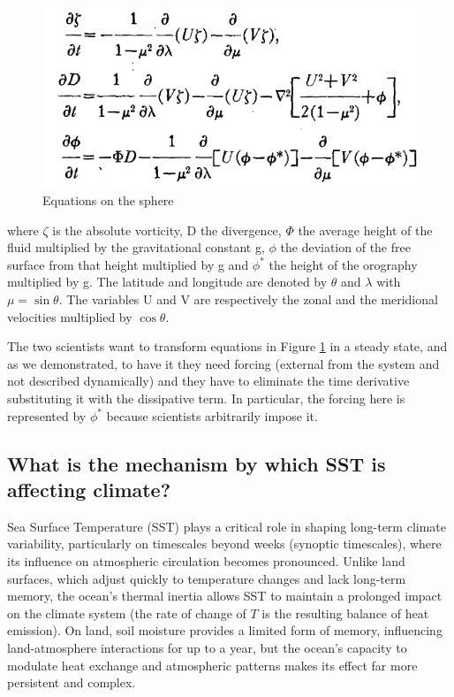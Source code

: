 \begin{figure}[htp!]
	\centering
	\includegraphics[width=0.5\linewidth]{upload/19image.png}
	\caption{Equations on the sphere}
	\label{fig: fig 2.2}

\end{figure}
where $\zeta$ is the absolute vorticity, D the divergence, $\Phi$
the average height of the fluid multiplied by the gravitational constant g, $\phi$ the deviation of the free surface from that height multiplied by g and $\phi^*$ the height of the orography multiplied by g. The latitude and longitude are denoted by $\theta$ and $\lambda$ with $\mu = \sin \theta$. The variables U and V are respectively the zonal and the meridional velocities multiplied by $\cos \theta$.


The two scientists want to transform equations in Figure \ref{fig: fig 2.2} in a steady state, and as we demonstrated, to have it they need forcing (external from the system and not described dynamically) and they have to eliminate the time derivative substituting it with the dissipative term.
In particular, the forcing here is represented by $\phi^*$ because scientists arbitrarily impose it.

\subsection{What is the mechanism by which SST is affecting climate?}

Sea Surface Temperature (SST) plays a critical role in shaping long-term climate variability, particularly on timescales beyond weeks (synoptic timescales), where its influence on atmospheric circulation becomes pronounced. Unlike land surfaces, which adjust quickly to temperature changes and lack long-term memory, the ocean's thermal inertia allows SST to maintain a prolonged impact on the climate system (the rate of change of $T$ is the resulting balance of heat emission). On land, soil moisture provides a limited form of memory, influencing land-atmosphere interactions for up to a year, but the ocean’s capacity to modulate heat exchange and atmospheric patterns makes its effect far more persistent and complex.

